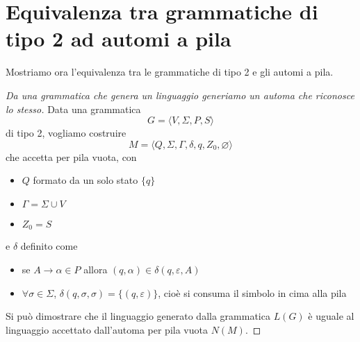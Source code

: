 \documentclass[12pt]{report}
\theoremstyle{definition}
\begin{document}
\section{Equivalenza tra grammatiche di tipo 2 ad automi a pila}
Mostriamo ora l'equivalenza tra le grammatiche di tipo 2 e gli automi a pila.
\begin{proof}[Da una grammatica che genera un linguaggio generiamo un automa che riconosce lo stesso]
Data una grammatica
$$ G = \langle V, \Sigma, P, S \rangle $$
di tipo 2, vogliamo costruire
$$ M = \langle Q, \Sigma, \Gamma, \delta, q, Z_0, \varnothing \rangle $$
che accetta per pila vuota, con
\begin{itemize}
 	\item $Q$ formato da un solo stato $\{q\}$
 	\item $\Gamma = \Sigma \cup V$
 	\item $Z_0 = S$
\end{itemize}
e $\delta$ definito come
\begin{itemize}
 	\item se $A \rightarrow \alpha \in P$ allora $(q, \alpha) \in \delta(q, \varepsilon, A)$
 	\item $\forall \sigma \in \Sigma$, $\delta(q, \sigma, \sigma) = \{ (q, \varepsilon) \}$, cioè si consuma il simbolo in cima alla pila
\end{itemize}
 
Si può dimostrare che il linguaggio generato dalla grammatica $L(G)$ è uguale al linguaggio accettato dall'automa per pila vuota $N(M)$.
\end{proof}
\end{document}
